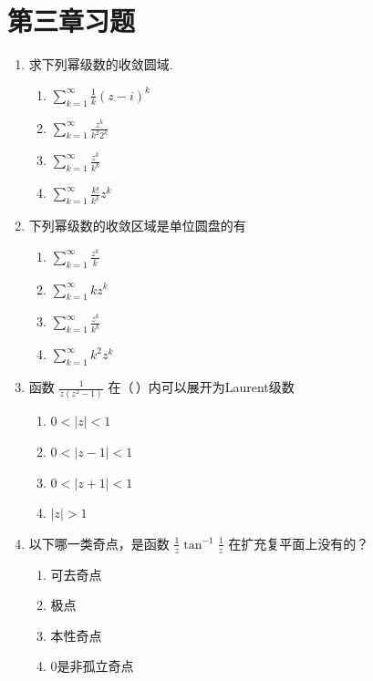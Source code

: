 \documentclass[openany,oneside]{ctexbook}
\begin{document}
\section{第三章习题}
\begin{enumerate}[label=\arabic*., start=1]
\item 求下列幂级数的收敛圆域.
\begin{enumerate}[label=(\arabic*)]
\item \(\displaystyle \sum_{k=1}^{\infty} \frac{1}{k} (z - i)^k\)
\item \(\displaystyle \sum_{k=1}^{\infty} \frac{z^k}{k^2 2^k}\)
\item \(\displaystyle \sum_{k=1}^{\infty} \frac{z^k}{k^k}\)
\item \(\displaystyle \sum_{k=1}^{\infty} \frac{k!}{k^k} z^k\)
\end{enumerate}

\item 下列幂级数的收敛区域是单位圆盘的有
\begin{enumerate}[label=\Alph*.]
\item \(\displaystyle \sum_{k=1}^{\infty} \frac{z^k}{k}\)
\item \(\displaystyle \sum_{k=1}^{\infty} kz^k\)
\item \(\displaystyle \sum_{k=1}^{\infty} \frac{z^k}{k^k}\)
\item \(\displaystyle \sum_{k=1}^{\infty} k^2 z^k\)
\end{enumerate}

\item 函数 \(\frac{1}{z(z^2-1)}\) 在（\,）内可以展开为Laurent级数
\begin{enumerate}[label=\Alph*.]
\item \(0 < |z| < 1\)
\item \(0 < |z - 1| < 1\)
\item \(0 < |z + 1| < 1\)
\item \(|z| > 1\)
\end{enumerate}

\item 以下哪一类奇点，是函数 \(\frac{1}{z} \tan^{-1} \frac{1}{z}\) 在扩充复平面上没有的？
\begin{enumerate}[label=\Alph*.]
\item 可去奇点
\item 极点
\item 本性奇点
\item 0是非孤立奇点
\end{enumerate}


\end{enumerate}
\end{document}

